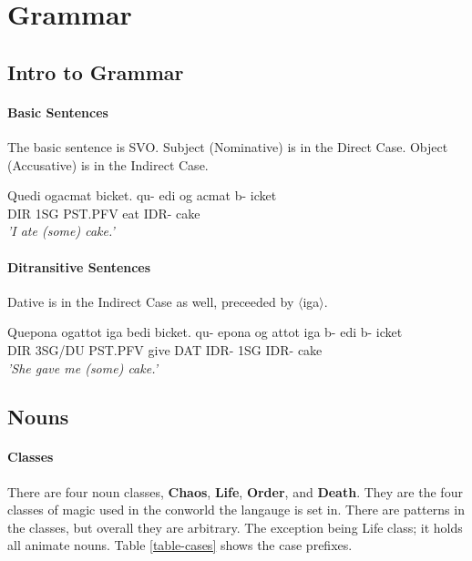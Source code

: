 \documentclass[11pt]{article}
\begin{document}
\newpage
\section{Grammar}

\subsection{Intro to Grammar}

\paragraph{Basic Sentences}
The basic sentence is SVO.
Subject (Nominative) is in the Direct Case.
Object (Accusative) is in the Indirect Case.

\begin{exe}
\ex \label{basicsentence}
Quedi ogacmat bicket.
\gll
qu-  edi og      acmat b-   icket\\
DIR  1SG PST.PFV eat   IDR- cake\\
\trans 
    \textit{'I ate (some) cake.'}\\
\end{exe}

\paragraph{Ditransitive Sentences}
Dative is in the Indirect Case as well, preceeded by $\langle$iga$\rangle$.

\begin{exe}
\ex \label{basicsentence}
Quepona ogattot iga bedi bicket.
\gll
qu-  epona  og      attot iga b-   edi b-   icket\\
DIR  3SG/DU PST.PFV give  DAT IDR- 1SG IDR- cake\\
\trans 
    \textit{'She gave me (some) cake.'}\\
\end{exe}


\subsection{Nouns}

\paragraph{Classes}
There are four noun classes,
\textbf{Chaos}, \textbf{Life}, \textbf{Order}, and \textbf{Death}.
They are the four classes of magic used in the conworld the langauge is set in.
There are patterns in the classes, but overall they are arbitrary.
The exception being Life class;
it holds all animate nouns.
Table \ref{table-cases} shows the case prefixes.
\end{document}
